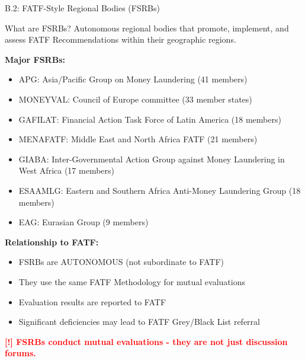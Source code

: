 \documentclass[11pt,a4paper]{beamer}
\newcommand{\redflag}[1]{\textcolor{red}{\textbf{[!] #1}}}
\begin{document}
	
	\begin{frame}{B.2: FATF-Style Regional Bodies (FSRBs)}
		\begin{block}{What are FSRBs?}
			Autonomous regional bodies that promote, implement, and assess FATF Recommendations within their geographic regions.
		\end{block}
		\textbf{Major FSRBs:}
		\begin{itemize}
			\item APG: Asia/Pacific Group on Money Laundering (41 members)
			\item MONEYVAL: Council of Europe committee (33 member states)
			\item GAFILAT: Financial Action Task Force of Latin America (18 members)
			\item MENAFATF: Middle East and North Africa FATF (21 members)
			\item GIABA: Inter-Governmental Action Group against Money Laundering in West Africa (17 members)
			\item ESAAMLG: Eastern and Southern Africa Anti-Money Laundering Group (18 members)
			\item EAG: Eurasian Group (9 members)
		\end{itemize}
		\textbf{Relationship to FATF:}
		\begin{itemize}
			\item FSRBs are AUTONOMOUS (not subordinate to FATF)
			\item They use the same FATF Methodology for mutual evaluations
			\item Evaluation results are reported to FATF
			\item Significant deficiencies may lead to FATF Grey/Black List referral
		\end{itemize}
		\redflag{FSRBs conduct mutual evaluations - they are not just discussion forums.}
	\end{frame}
	
\end{document}
